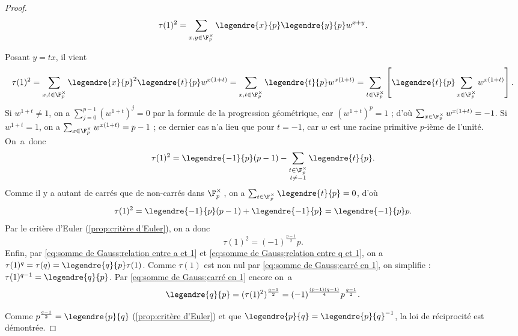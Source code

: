 \documentclass[11pt, %
  title in boldface,
  theorem in new line,
  theorem numbering = section,
  number theorems separately,
  simple name,
]{beaulivre}
\begin{document}
\begin{proof}
        \vspace{-.2\baselineskip}%
        \[
            \tau(1)^2 = \sum_{x,y \in \F_p^\times} \legendre{x}{p} \legendre{y}{p} w^{x+y}.
        \]
        \vspace{-1.2\baselineskip}\par\noindent%
        Posant \( y = tx \), il vient
        \vspace{-.2\baselineskip}%
        \[
            \tau(1)^2 = \sum_{x,t \in \F_p^\times} \legendre{x}{p}^2 \legendre{t}{p} w^{x(1+t)} = \sum_{x,t \in \F_p^\times} \legendre{t}{p} w^{x(1+t)} = \sum_{t \in \F_p^\times} \left[ \legendre{t}{p} \sum_{x \in \F_p^\times} w^{x(1+t)} \right].
        \]
        Si \( w^{1+t} \neq 1 \), on a \( \sum_{j=0}^{p-1} (w^{1+t})^j = 0 \) par la formule de la progression géométrique, car \( (w^{1+t})^p = 1 \) ; d'où \( \sum_{x \in \F_p^\times} w^{x(1+t)} = -1 \). Si \( w^{1+t} = 1 \), on a \( \sum_{x \in \F_p^\times} w^{x(1+t)} = p-1 \) ; ce dernier cas n'a lieu que pour \( t = -1 \), car \( w \) est une racine primitive \( p \)‑ième de l'unité. On~a~donc
        {\[\setlength{\abovedisplayskip}{.5\baselineskip}%
        \setlength{\belowdisplayskip}{.5\baselineskip}%
            \tau(1)^2 = \legendre{-1}{p}(p-1) - \sum_{\substack{t \in \F_p^\times \\ t \neq -1}} \legendre{t}{p}.
        \]}%
        Comme il y a autant de carrés que de non-carrés dans \( \F_p^\times \)\,, on a \( \sum_{t \in \F_p^\times} \legendre{t}{p} = 0 \), d'où
        \vspace{-.25\baselineskip}%
        \[
            \tau(1)^2 = \legendre{-1}{p}(p-1) + \legendre{-1}{p} = \legendre{-1}{p} p.
        \]
        Par le critère d'Euler (\cref{prop:critère d'Euler}), on a donc
        \vspace{-.25\baselineskip}%
        \begin{equation}\label{eq:somme de Gauss;carré en 1}
            \tau(1)^2 = (-1)^{\frac{p-1}{2}} p.
        \end{equation}
        Enfin, par \eqref{eq:somme de Gauss;relation entre a et 1} et \eqref{eq:somme de Gauss;relation entre q et 1}, on a \( \tau(1)^q = \tau(q) = \legendre{q}{p} \tau(1) \). Comme \( \tau(1) \) est non nul par \eqref{eq:somme de Gauss;carré en 1}, on simplifie : \( \tau(1)^{q-1} = \legendre{q}{p} \). Par \eqref{eq:somme de Gauss;carré en 1} encore on~a
        \vspace{-.3\baselineskip}%
        \[
            \legendre{q}{p} = (\tau(1)^2)^{\frac{q-1}{2}} = (-1)^{\frac{(p-1)(q-1)}{4}} p^{\frac{q-1}{2}}.
        \]
        \vspace{-.7\baselineskip}\par\noindent%
        Comme \( p^{\frac{q-1}{2}} = \legendre{p}{q} \) (\cref{prop:critère d'Euler}) et que \( \legendre{p}{q} = \legendre{p}{q}^{-1} \), la loi de réciprocité est démontrée.
    \end{proof}
\end{document}
